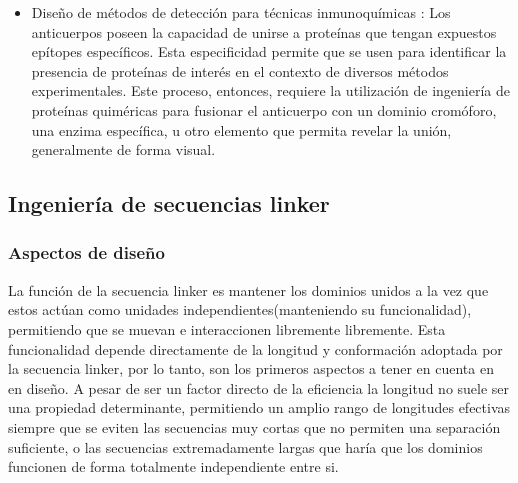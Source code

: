 \begin{itemize}
\item Diseño de métodos de detección para técnicas inmunoquímicas \cite{arai1998construction,arai2000fluorolabeling,suzuki1999open}:
Los anticuerpos poseen la capacidad de unirse a proteínas que tengan expuestos epítopes específicos. 
Esta especificidad permite que se usen para identificar la presencia de proteínas de interés en el contexto de diversos métodos experimentales.
Este proceso, entonces, requiere la utilización de ingeniería de proteínas quiméricas para fusionar el anticuerpo con un dominio cromóforo, una enzima específica, u otro elemento que permita revelar la unión, generalmente de forma visual.


\end{itemize}













\subsection{Ingeniería de secuencias linker}

\subsubsection{Aspectos de diseño}


La función de la secuencia linker es mantener los dominios unidos a la vez que estos actúan como unidades independientes(manteniendo su funcionalidad), 
permitiendo que se muevan e interaccionen libremente libremente. 
Esta funcionalidad depende directamente de la longitud y conformación adoptada por la secuencia linker, por lo tanto, son los primeros aspectos a tener en cuenta en en diseño.
A pesar de ser un factor directo de la eficiencia\cite{robinson1998optimizing} la longitud no suele ser una propiedad determinante, permitiendo un amplio rango de longitudes efectivas siempre 
que se eviten las secuencias muy cortas que no permiten una separación suficiente, o las secuencias extremadamente largas que haría que los dominios funcionen de forma totalmente independiente entre si.

